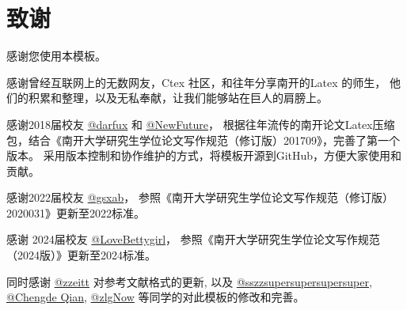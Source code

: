 
\cleardoublepage
{}
\chapter*{致谢}
 {
  \fangsong
  \setlength{\baselineskip}{16pt}
  \setlength{\parskip}{0pt}

  感谢您使用本模板。

  感谢曾经互联网上的无数网友，Ctex 社区，和往年分享南开的Latex 的师生，
  他们的积累和整理，以及无私奉献，让我们能够站在巨人的肩膀上。

  感谢2018届校友 \href{https://github.com/darfux}{@darfux} 和 \href{https://github.com/newfuture}{@NewFuture}，
  根据往年流传的南开论文Latex压缩包，结合《南开大学研究生学位论文写作规范（修订版）201709》，完善了第一个版本。
  采用版本控制和协作维护的方式，将模板开源到GitHub，方便大家使用和贡献。

  感谢2022届校友 \href{https://github.com/gsxab}{@gsxab}，
  参照《南开大学研究生学位论文写作规范（修订版）2020031》更新至2022标准。

  感谢 2024届校友 \href{https://github.com/lovebettygirl}{@LoveBettygirl}，
  参照《南开大学研究生学位论文写作规范（2024版）》更新至2024标准。

  同时感谢 \href{https://github.com/zzeitt}{@zzeitt} 对参考文献格式的更新,
  以及
  \href{https://github.com/sszzsupersupersupersuper}{@sszzsupersupersupersuper},
  \href{https://github.com/qianchd}{@Chengde Qian},
  \href{https://github.com/zlgnow}{@zlgNow}
  等同学的对此模板的修改和完善。

 }

